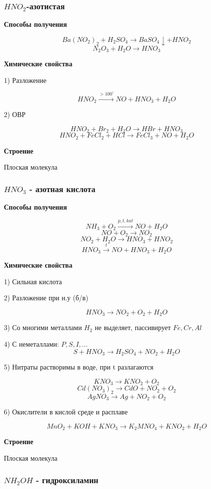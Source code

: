 \documentclass[14pt,a4paper]{scrartcl}
\begin{document}
\subsubsection{$HNO_2$-азотистая}

\textbf{Способы получения}

$$Ba(NO_2)_2 + H_2SO_4 \rightarrow BaSO_4\downarrow + HNO_2$$
$$N_2O_3 + H_2O \rightarrow HNO_3$$

\textbf{Химические свойства}

1) Разложение

$$HNO_2 \xrightarrow{>100^{\circ}} NO + HNO_3 + H_2O$$

2) ОВР

$$HNO_2 + Br_2 + H_2O \rightarrow HBr + HNO_3$$
$$HNO_2 + FeCl_2 + HCl \rightarrow FeCl_3 + NO + H_2O$$

\textbf{Строение}

Плоская молекула

\subsubsection{$HNO_3$ - азотная кислота}

\textbf{Способы получения}

$$NH_3 + O_2 \xrightarrow{p,t,kat} NO + H_2O$$
$$NO + O_2 \rightarrow NO_2$$
$$NO_2+H_2O \rightarrow HNO_3 + HNO_2$$
$$HNO_3 \xrightarrow{t} NO + HNO_3 + H_2O$$

\textbf{Химические свойства}

1) Сильная кислота

2) Разложение при н.у (б/в)

$$HNO_3 \rightarrow NO_2 + O_2 + H_2O$$

3) Со многими металлами $H_2$ не выделяет, пассивирует $Fe,Cr,Al$

4) С неметаллами: $P, S, I,...$
$$ S + HNO_3 \rightarrow H_2SO_4 + NO_2 + H_2O$$

5) Нитраты растворимы в воде, при t разлагаются

$$KNO_3 \rightarrow KNO_2 + O_2$$
$$Cd(NO_3)_2 \rightarrow CdO + NO_2 + O_2$$
$$AgNO_3 \rightarrow Ag + NO_2 + O_2$$

6) Окислители в кислой среде и расплаве

$$MnO_2 + KOH + KNO_3 \rightarrow K_2MNO_4 + KNO_2 + H_2O$$

\textbf{Строение}

Плоская молекула

\subsubsection{$NH_2OH$ - гидроксиламин}
\end{document}
